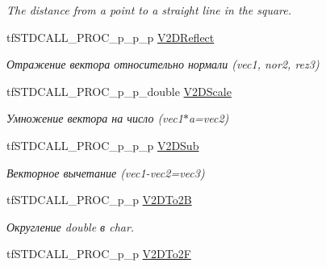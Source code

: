 \begin{DoxyCompactItemize}
\begin{DoxyCompactList}\small\item\em The distance from a point to a straight line in the square. \end{DoxyCompactList}\item 
\hypertarget{structs_functions_vector_c_p_u_ab300b922a80dc06b909041a914cbd92e}{tf\-S\-T\-D\-C\-A\-L\-L\-\_\-\-P\-R\-O\-C\-\_\-p\-\_\-p\-\_\-p \hyperlink{structs_functions_vector_c_p_u_ab300b922a80dc06b909041a914cbd92e}{V2\-D\-Reflect}}\label{structs_functions_vector_c_p_u_ab300b922a80dc06b909041a914cbd92e}

\begin{DoxyCompactList}\small\item\em Отражение вектора относительно нормали (vec1, nor2, rez3) \end{DoxyCompactList}\item 
\hypertarget{structs_functions_vector_c_p_u_a3f325a41cbdae8b3f51329d35d674c1e}{tf\-S\-T\-D\-C\-A\-L\-L\-\_\-\-P\-R\-O\-C\-\_\-p\-\_\-p\-\_\-double \hyperlink{structs_functions_vector_c_p_u_a3f325a41cbdae8b3f51329d35d674c1e}{V2\-D\-Scale}}\label{structs_functions_vector_c_p_u_a3f325a41cbdae8b3f51329d35d674c1e}

\begin{DoxyCompactList}\small\item\em Умножение вектора на число (vec1$\ast$a=vec2) \end{DoxyCompactList}\item 
\hypertarget{structs_functions_vector_c_p_u_ad22e083ca1ec77e9dc79a5d892ffdc34}{tf\-S\-T\-D\-C\-A\-L\-L\-\_\-\-P\-R\-O\-C\-\_\-p\-\_\-p\-\_\-p \hyperlink{structs_functions_vector_c_p_u_ad22e083ca1ec77e9dc79a5d892ffdc34}{V2\-D\-Sub}}\label{structs_functions_vector_c_p_u_ad22e083ca1ec77e9dc79a5d892ffdc34}

\begin{DoxyCompactList}\small\item\em Векторное вычетание (vec1-\/vec2=vec3) \end{DoxyCompactList}\item 
\hypertarget{structs_functions_vector_c_p_u_a214843ff1cc668786c625bfd3ee13fb7}{tf\-S\-T\-D\-C\-A\-L\-L\-\_\-\-P\-R\-O\-C\-\_\-p\-\_\-p \hyperlink{structs_functions_vector_c_p_u_a214843ff1cc668786c625bfd3ee13fb7}{V2\-D\-To2\-B}}\label{structs_functions_vector_c_p_u_a214843ff1cc668786c625bfd3ee13fb7}

\begin{DoxyCompactList}\small\item\em Округление double в char. \end{DoxyCompactList}\item 
\hypertarget{structs_functions_vector_c_p_u_a4e4b9e7111d6a22c1332bcfeb45abce4}{tf\-S\-T\-D\-C\-A\-L\-L\-\_\-\-P\-R\-O\-C\-\_\-p\-\_\-p \hyperlink{structs_functions_vector_c_p_u_a4e4b9e7111d6a22c1332bcfeb45abce4}{V2\-D\-To2\-F}}\label{structs_functions_vector_c_p_u_a4e4b9e7111d6a22c1332bcfeb45abce4}


\end{DoxyCompactItemize}
